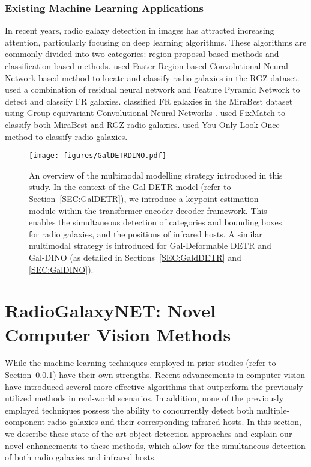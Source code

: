\documentclass[
  journal=pasa,
  manuscript=research-paper, %
  year=2020,
  volume=37,
]{cup-journal}
\begin{document}
\subsubsection{Existing Machine Learning Applications}
\label{SEC:Related2}
In recent years, radio galaxy detection in images has attracted increasing attention, particularly focusing on deep learning algorithms. 
These algorithms are commonly divided into two categories: region-proposal-based methods and classification-based methods.
\cite{wu19} used Faster Region-based Convolutional Neural Network \citep[Faster-RCNN;][]{Shaoqing15} based method to locate and classify radio galaxies in the RGZ dataset.
\cite{lao21} used a combination of residual neural network \citep[ResNet;][]{he16CVPR} and Feature Pyramid Network \citep[FPN;][]{lin17CVPR} to detect and classify FR galaxies.
\cite{scaife21} classified FR galaxies in the MiraBest dataset using Group equivariant Convolutional Neural Networks \citep[G-CNNs;][]{cohen16ICML}.
\cite{slijepcevic22} used FixMatch \citep{sohn2020fixmatch} to classify both MiraBest and RGZ radio galaxies.
\cite{zhang22} used You Only Look Once method \citep[YOLOv5;][]{redmon16CVPR} to classify radio galaxies.

%
\begin{figure*}
\centering
\texttt{[image: figures/GalDETRDINO.pdf]}
\caption{An overview of the multimodal modelling strategy introduced in this study. In the context of the Gal-DETR model (refer to Section~\ref{SEC:GalDETR}), we introduce a keypoint estimation module within the transformer encoder-decoder framework. This enables the simultaneous detection of categories and bounding boxes for radio galaxies, and the positions of infrared hosts. A similar multimodal strategy is introduced for Gal-Deformable DETR and Gal-DINO (as detailed in Sections~\ref{SEC:GaldDETR} and \ref{SEC:GalDINO}).} 
\label{FIG:NET_Overview}
\end{figure*}
%

\section{RadioGalaxyNET: Novel Computer Vision Methods}
\label{SEC:Methods}
While the machine learning techniques employed in prior studies (refer to Section~\ref{SEC:Related2}) have their own strengths. 
Recent advancements in computer vision have introduced several more effective algorithms that outperform the previously utilized methods in real-world scenarios. 
In addition, none of the previously employed techniques possess the ability to concurrently detect both multiple-component radio galaxies and their corresponding infrared hosts.
In this section, we describe these state-of-the-art object detection approaches and explain our novel enhancements to these methods, which allow for the simultaneous detection of both radio galaxies and infrared hosts.
\end{document}

